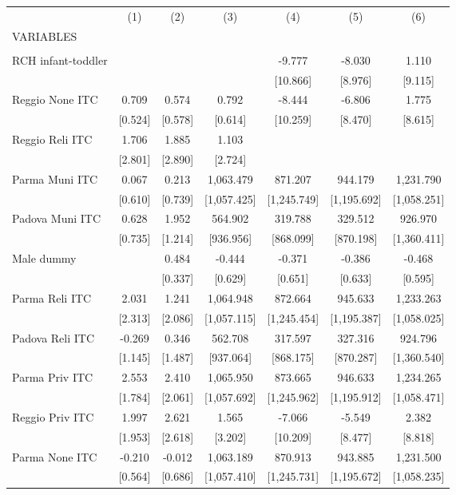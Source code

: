 \begin{tabular}{lcccccc} \hline
 & (1) & (2) & (3) & (4) & (5) & (6) \\
VARIABLES &  &  &  &  &  &  \\ \hline
 &  &  &  &  &  &  \\
RCH infant-toddler &  &  &  & -9.777 & -8.030 & 1.110 \\
 &  &  &  & [10.866] & [8.976] & [9.115] \\
Reggio None ITC & 0.709 & 0.574 & 0.792 & -8.444 & -6.806 & 1.775 \\
 & [0.524] & [0.578] & [0.614] & [10.259] & [8.470] & [8.615] \\
Reggio Reli ITC & 1.706 & 1.885 & 1.103 &  &  &  \\
 & [2.801] & [2.890] & [2.724] &  &  &  \\
Parma Muni ITC & 0.067 & 0.213 & 1,063.479 & 871.207 & 944.179 & 1,231.790 \\
 & [0.610] & [0.739] & [1,057.425] & [1,245.749] & [1,195.692] & [1,058.251] \\
Padova Muni ITC & 0.628 & 1.952 & 564.902 & 319.788 & 329.512 & 926.970 \\
 & [0.735] & [1.214] & [936.956] & [868.099] & [870.198] & [1,360.411] \\
Male dummy &  & 0.484 & -0.444 & -0.371 & -0.386 & -0.468 \\
 &  & [0.337] & [0.629] & [0.651] & [0.633] & [0.595] \\
Parma Reli ITC & 2.031 & 1.241 & 1,064.948 & 872.664 & 945.633 & 1,233.263 \\
 & [2.313] & [2.086] & [1,057.115] & [1,245.454] & [1,195.387] & [1,058.025] \\
Padova Reli ITC & -0.269 & 0.346 & 562.708 & 317.597 & 327.316 & 924.796 \\
 & [1.145] & [1.487] & [937.064] & [868.175] & [870.287] & [1,360.540] \\
Parma Priv ITC & 2.553 & 2.410 & 1,065.950 & 873.665 & 946.633 & 1,234.265 \\
 & [1.784] & [2.061] & [1,057.692] & [1,245.962] & [1,195.912] & [1,058.471] \\
Reggio Priv ITC & 1.997 & 2.621 & 1.565 & -7.066 & -5.549 & 2.382 \\
 & [1.953] & [2.618] & [3.202] & [10.209] & [8.477] & [8.818] \\
Parma None ITC & -0.210 & -0.012 & 1,063.189 & 870.913 & 943.885 & 1,231.500 \\
 & [0.564] & [0.686] & [1,057.410] & [1,245.731] & [1,195.672] & [1,058.235] \\

\end{tabular}
